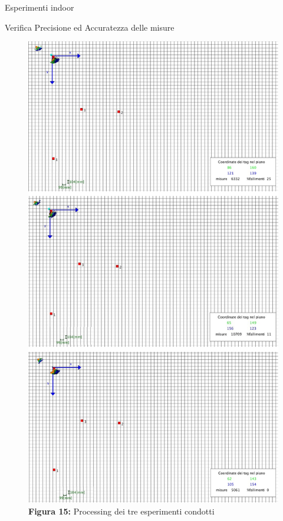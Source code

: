 \documentclass[12pt]{report}
\begin{document}
\begin{section}{Esperimenti indoor}
\begin{subsection}{Verifica Precisione ed Accuratezza delle misure}
\begin{figure}[H]
				\includegraphics[scale=0.45]{EspPrecis1}
	 			\caption{\textbf{Figura 15:} Processing dei tre esperimenti condotti\label{FEspPrecis1}}
			\end{figure}


\end{subsection}
\end{section}
\end{document}

